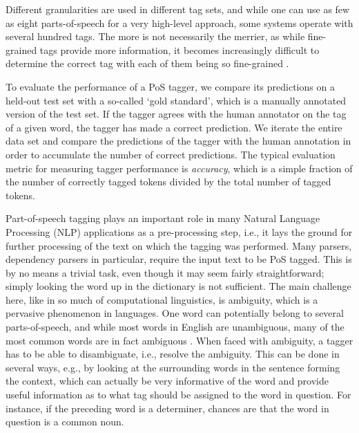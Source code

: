 \documentclass[a4paper,12pt,english]{book}
\begin{document}
Different granularities are used in different tag sets, and while one can use
as few as eight parts-of-speech for a very high-level approach, some systems
operate with several hundred tags. The more is not necessarily the merrier, as
while fine-grained tags provide more information, it becomes increasingly
difficult to determine the correct tag with each of them being so fine-grained
\cite[pp.~157--158]{Jur:Mar:09}.

To evaluate the performance of a PoS tagger, we compare its predictions on a
held-out test set with a so-called `gold standard', which is a manually
annotated version of the test set. If the tagger agrees with the human
annotator on the tag of a given word, the tagger has made a correct prediction.
We iterate the entire data set and compare the predictions of the tagger with
the human annotation in order to accumulate the number of correct predictions.
The typical evaluation metric for measuring tagger performance is
\emph{accuracy}, which is a simple fraction of the number of correctly tagged
tokens divided by the total number of tagged tokens.

Part-of-speech tagging plays an important role in many Natural Language
Processing (NLP) applications as a pre-processing step, i.e., it lays the
ground for further processing of the text on which the tagging was performed.
Many parsers, dependency parsers in particular, require the input text to be
PoS tagged. This is by no means a trivial task, even though it may seem fairly
straightforward; simply looking the word up in the dictionary is not
sufficient. The main challenge here, like in so much of computational
linguistics, is ambiguity, which is a pervasive phenomenon in languages. One
word can potentially belong to several parts-of-speech, and while most words in
English are unambiguous, many of the most common words are in fact ambiguous
\cite[p.~167]{Jur:Mar:09}.  When faced with ambiguity, a tagger has to be able
to disambiguate, i.e., resolve the ambiguity. This can be done in several ways,
e.g., by looking at the surrounding words in the sentence forming the context,
which can actually be very informative of the word and provide useful
information as to what tag should be assigned to the word in question. For
instance, if the preceding word is a determiner, chances are that the word in
question is a common noun.
\end{document}

